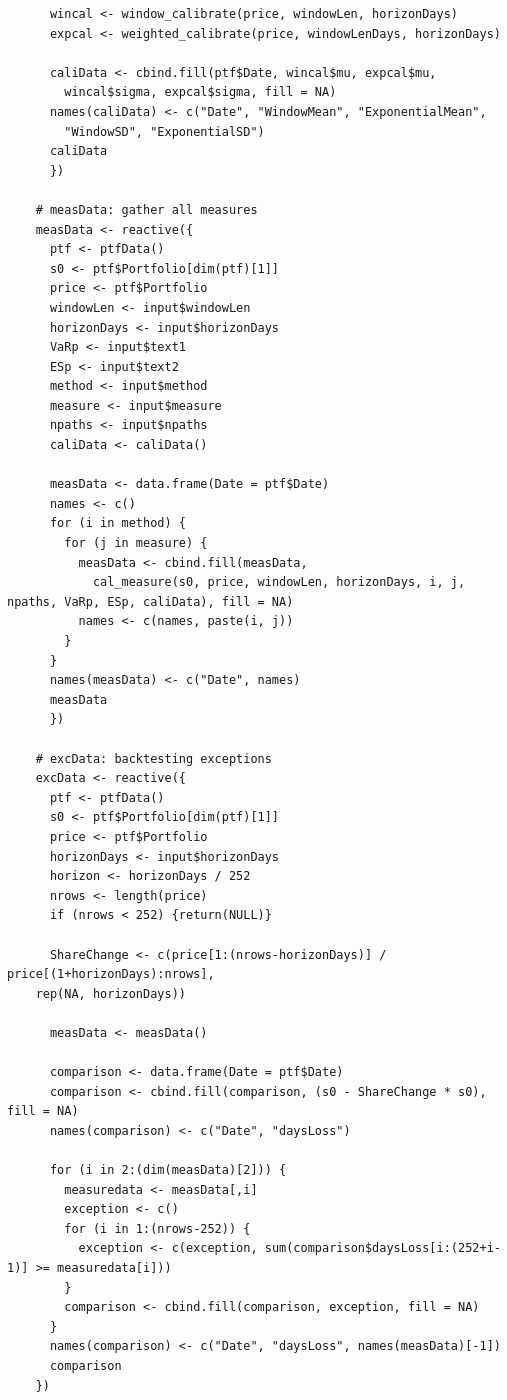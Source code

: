 \documentclass[letterpaper,11pt, oneside]{layout}
\begin{document}
\begin{spacing}{1}
\begin{lstlisting}
      wincal <- window_calibrate(price, windowLen, horizonDays)
      expcal <- weighted_calibrate(price, windowLenDays, horizonDays)

      caliData <- cbind.fill(ptf$Date, wincal$mu, expcal$mu,
        wincal$sigma, expcal$sigma, fill = NA)
      names(caliData) <- c("Date", "WindowMean", "ExponentialMean", 
        "WindowSD", "ExponentialSD")
      caliData
      })

    # measData: gather all measures
    measData <- reactive({
      ptf <- ptfData()
      s0 <- ptf$Portfolio[dim(ptf)[1]]
      price <- ptf$Portfolio
      windowLen <- input$windowLen
      horizonDays <- input$horizonDays
      VaRp <- input$text1
      ESp <- input$text2
      method <- input$method
      measure <- input$measure
      npaths <- input$npaths
      caliData <- caliData()

      measData <- data.frame(Date = ptf$Date)
      names <- c()
      for (i in method) {
        for (j in measure) {
          measData <- cbind.fill(measData, 
            cal_measure(s0, price, windowLen, horizonDays, i, j, npaths, VaRp, ESp, caliData), fill = NA)
          names <- c(names, paste(i, j))
        }
      }
      names(measData) <- c("Date", names)
      measData
      })

    # excData: backtesting exceptions
    excData <- reactive({
      ptf <- ptfData()
      s0 <- ptf$Portfolio[dim(ptf)[1]]
      price <- ptf$Portfolio
      horizonDays <- input$horizonDays
      horizon <- horizonDays / 252
      nrows <- length(price)
      if (nrows < 252) {return(NULL)}

      ShareChange <- c(price[1:(nrows-horizonDays)] / price[(1+horizonDays):nrows], 
    rep(NA, horizonDays))

      measData <- measData()

      comparison <- data.frame(Date = ptf$Date)
      comparison <- cbind.fill(comparison, (s0 - ShareChange * s0), fill = NA)
      names(comparison) <- c("Date", "daysLoss")

      for (i in 2:(dim(measData)[2])) {
        measuredata <- measData[,i]
        exception <- c()
        for (i in 1:(nrows-252)) {
          exception <- c(exception, sum(comparison$daysLoss[i:(252+i-1)] >= measuredata[i]))
        }
        comparison <- cbind.fill(comparison, exception, fill = NA)
      }
      names(comparison) <- c("Date", "daysLoss", names(measData)[-1])
      comparison
    })


\end{lstlisting}
\end{spacing}
\end{document}
